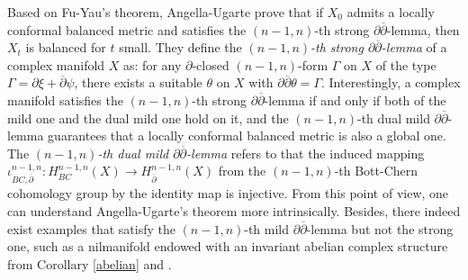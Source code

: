 \documentclass[12pt]{amsart}
\numberwithin{equation}{section}
\renewcommand{\1}{\mathds{1}}
\newcommand{\db}{\overline{\partial}}
\renewcommand{\>}{\rightarrow}
\newcommand{\p}{\partial}
\def\p{\partial}
\begin{document}
Based on Fu-Yau's theorem, Angella-Ugarte \cite[Theorem
4.9]{au} prove that if $X_0$ admits a locally conformal balanced
metric and satisfies the $(n-1,n)$-th strong $\p\db$-lemma, then
$X_t$ is balanced for $t$ small. They define the \emph{$(n-1,n)$-th strong
$\p\db$-lemma} of a complex manifold $X$ as: for any $\p$-closed $(n-1,n)$-form $\Gamma$
on $X$ of the type $\Gamma=\p\xi+\db \psi$, there exists a suitable $\theta$
on $X$ with $ \p \db \theta = \Gamma. $ Interestingly, a complex manifold satisfies the $(n-1,n)$-th strong
$\p\db$-lemma if and only if both of the mild one and the dual mild
one hold on it, and the $(n-1,n)$-th dual mild $\p\db$-lemma
guarantees that a locally conformal balanced metric is also a global
one. The \emph{$(n-1,n)$-th dual mild $\p\db$-lemma} refers to that the induced mapping
$\iota^{n-1,n}_{BC,\db}: H^{n-1,n}_{BC}(X) \rightarrow
H^{n-1,n}_{\db}(X)$ from the $({n-1,n})$-th Bott-Chern cohomology group by the identity map is injective.
From this point of view, one can understand
Angella-Ugarte's theorem more intrinsically.
Besides, there indeed exist examples that satisfy the $(n-1,n)$-th mild $\p\db$-lemma but not the strong one,
such as a nilmanifold endowed with an invariant abelian complex structure
from Corollary \ref{abelian} and \cite[Proposition 2.9]{AU}.
\end{document}

